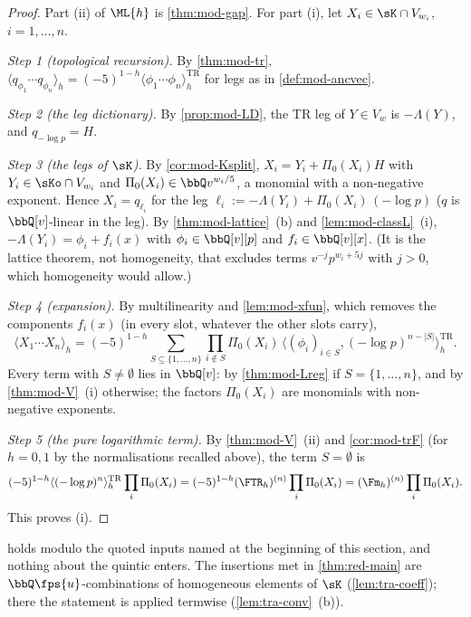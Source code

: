 \begin{proof}
Part (ii) of $\ML{h}$ is \cref{thm:mod-gap}. For part (i), let $X_i\in\sK\cap V_{w_i}$, $i=1,\dots,n$.

\emph{Step 1 (topological recursion).} By \cref{thm:mod-tr}, $\langle q_{\phi_1}\cdots q_{\phi_n}\rangle_h=(-5)^{1-h}\langle\phi_1\cdots\phi_n\rangle^{\mathrm{TR}}_h$ for legs as in \cref{def:mod-ancvec}.

\emph{Step 2 (the leg dictionary).} By \cref{prop:mod-LD}, the TR leg of $Y\in V_w$ is $-\Lambda(Y)$, and $q_{-\log p}=H$.

\emph{Step 3 (the legs of $\sK$).} By \cref{cor:mod-Ksplit}, $X_i=Y_i+\Pi_0(X_i)H$ with $Y_i\in\sKo\cap V_{w_i}$ and $\Pi_0(X_i)\in\bbQ v^{w_i/5}$, a monomial with a non-negative exponent. Hence $X_i=q_{\ell_i}$ for the leg $\ell_i:=-\Lambda(Y_i)+\Pi_0(X_i)\,(-\log p)$ ($q$ is $\bbQ[v]$-linear in the leg). By \cref{thm:mod-lattice}~(b) and \cref{lem:mod-classL}~(i), $-\Lambda(Y_i)=\phi_i+f_i(x)$ with $\phi_i\in\bbQ[v][p]$ and $f_i\in\bbQ[v][x]$. (It is the lattice theorem, not homogeneity, that excludes terms $v^{-j}p^{w_i+5j}$ with $j>0$, which homogeneity would allow.)

\emph{Step 4 (expansion).} By multilinearity and \cref{lem:mod-xfun}, which removes the components $f_i(x)$ (in every slot, whatever the other slots carry),
\[
\langle X_1\cdots X_n\rangle_h=(-5)^{1-h}\sum_{S\subseteq\{1,\dots,n\}}\prod_{i\notin S}\Pi_0(X_i)\,\big\langle(\phi_i)_{i\in S},(-\log p)^{n-|S|}\big\rangle^{\mathrm{TR}}_h .
\]
Every term with $S\neq\emptyset$ lies in $\bbQ[v]$: by \cref{thm:mod-Lreg} if $S=\{1,\dots,n\}$, and by \cref{thm:mod-V}~(i) otherwise; the factors $\Pi_0(X_i)$ are monomials with non-negative exponents.

\emph{Step 5 (the pure logarithmic term).} By \cref{thm:mod-V}~(ii) and \cref{cor:mod-trF} (for $h=0,1$ by the normalisations recalled above), the term $S=\emptyset$ is
\[
(-5)^{1-h}\langle(-\log p)^n\rangle^{\mathrm{TR}}_h\prod_i\Pi_0(X_i)=(-5)^{1-h}(\FTR_h)^{(n)}\prod_i\Pi_0(X_i)=(\Fm_h)^{(n)}\prod_i\Pi_0(X_i).
\]
This proves (i).
\end{proof}

 holds modulo the quoted inputs named at the beginning of this section, and nothing about the quintic enters. The insertions met in \cref{thm:red-main} are $\bbQ\fps{u}$-combinations of homogeneous elements of $\sK$ (\cref{lem:tra-coeff}); there the statement is applied termwise (\cref{lem:tra-conv}~(b)).

